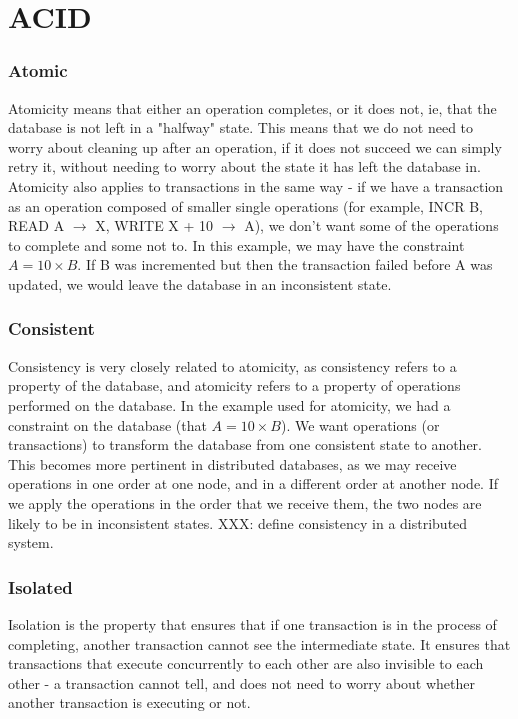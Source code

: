 \documentclass[12pt,twoside,notitlepage]{report}
\begin{document}
\section{ACID}

\subsubsection*{Atomic}

Atomicity means that either an operation completes, or it does not, ie, that the database is not
left in a "halfway" state. This means that we do not need to worry about cleaning up after an
operation, if it does not succeed we can simply retry it, without needing to worry about the state
it has left the database in. Atomicity also applies to transactions in the same way - if we have
a transaction as an operation composed of smaller single operations (for example, INCR B, READ A
$\rightarrow$ X, WRITE X + 10 $\rightarrow$ A), we don't want some of the operations to complete
and some not to. In this example, we may have the constraint $A = 10\times B$. If B was incremented but then
the transaction failed before A was updated, we would leave the database in an inconsistent state.

\subsubsection*{Consistent}

Consistency is very closely related to atomicity, as consistency refers to a property of the
database, and atomicity refers to a property of operations performed on the database. In the
example used for atomicity, we had a constraint on the database (that $A = 10\times B$). We want operations
(or transactions) to transform the database from one consistent state to another. This becomes
more pertinent in distributed databases, as we may receive operations in one order at one node,
and in a different order at another node. If we apply the operations in the order that we receive
them, the two nodes are likely to be in inconsistent states. XXX: define consistency in a
distributed system.

\subsubsection*{Isolated}

Isolation is the property that ensures that if one transaction is in the process of completing,
another transaction cannot see the intermediate state. It ensures that transactions that execute
concurrently to each other are also invisible to each other - a transaction cannot tell, and does
not need to worry about whether another transaction is executing or not.
\end{document}
